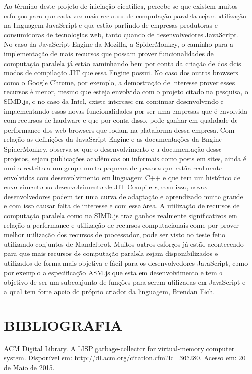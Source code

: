 \documentclass{article}
\begin{document}
Ao término deste projeto de iniciação científica, percebe-se que existem muitos esforços
para que cada vez mais recursos de computação paralela sejam utilização na linguagem
JavaScript e que estão partindo de empresas produtoras e consumidoras de tecnologias
web, tanto quando de desenvolvedores JavaScript.
No caso da JavaScript Engine da Mozilla, a SpiderMonkey, o caminho para a implementação
de mais recursos que possam prover funcionalidades de computação paralela já estão
caminhando bem por conta da criação de dos dois modos de compilação JIT que essa
Engine possui. No caso dos outros browsers como o Google Chrome, por exemplo, a
demostração de interesse prover esses recursos é menor, mesmo que esteja envolvida com
o projeto citado na pesquisa, o SIMD.js, e no caso da Intel, existe interesse em continuar
desenvolvendo e implementando essas novas funcionalidades por ser uma empresas que é
envolvida com recursos de hardware e que por conta disso, pode ganhar em qualidade de
performance dos web browsers que rodam na plataforma dessa empresa.
Com relação as definições da JavaScript Engine e as documentações da Engine
SpiderMonkey, observa-se que o desenvolvimento e a documentação desse projetos, sejam
publicações acadêmicas ou informais como posts em sites, ainda é muito restrito a um grupo
muito pequeno de pessoas que estão realmente envolvidas com desenvolvimento em
linguagem C++ e que tem um histórico de envolvimento no desenvolvimento de JIT
Compilers, com isso, novos desenvolvedores podem ter uma curva de adaptação e
aprendizado muito grande e com isso causar falta de interesse e com essa área.
A utilização de recursos de computação paralela como na SIMD.js traz ganhos realmente
significativos em relação a performance e utilização de recursos computacionais como por
prover melhor utilização dos recursos de processador, pode ser visto no teste feito utilizando
conjuntos de Mandelbrot. Muitos outros esforços já estão acontecendo para que mais
recursos de computação paralela sejam disponibilizados e utilizados de forma mais objetiva
e fácil para os desenvolvedores JavaScript, como por exemplo a especificação ASM.js que
esta em desenvolvimento e tem o objetivo de ser um subconjunto de funções para serem
utilizadas em JavaScript e a qual tem forte apoio do próprio criador da linguagem, Brendan
Eich.


\section{BIBLIOGRAFIA}
ACM Digital Library. A LISP garbage-collector for virtual-memory computer system.
Disponível em: \url{http://dl.acm.org/citation.cfm?id=363280}.
Acesso em: 20 de Maio de 2015.
\end{document}

